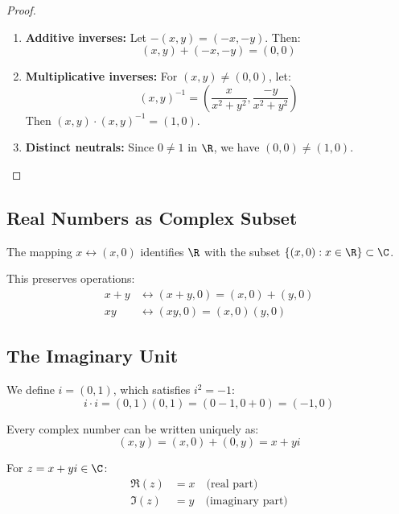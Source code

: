 \begin{proof}
\begin{enumerate}[label=(\roman*)]
        \item \textbf{Additive inverses:} Let $-(x,y) = (-x,-y)$. Then:
        \[
            (x,y) + (-x,-y) = (0,0)
        \]
        
        \item \textbf{Multiplicative inverses:} For $(x,y) \neq (0,0)$, let:
        \[
            (x,y)^{-1} = \left(\frac{x}{x^2+y^2}, \frac{-y}{x^2+y^2}\right)
        \]
        Then $(x,y) \cdot (x,y)^{-1} = (1,0)$.
        
        \item \textbf{Distinct neutrals:} Since $0 \neq 1$ in $\R$, we have $(0,0) \neq (1,0)$.
    \end{enumerate}
\end{proof}

\subsection{Real Numbers as Complex Subset}

The mapping $x \leftrightarrow (x,0)$ identifies $\R$ with the subset $\{(x,0) : x \in \R\} \subset \C$.

This preserves operations:
\begin{align}
    x + y &\leftrightarrow (x+y, 0) = (x,0) + (y,0) \\
    xy &\leftrightarrow (xy, 0) = (x,0)(y,0)
\end{align}

\subsection{The Imaginary Unit}

\begin{definition*}\label{def:imaginary-unit}
    We define $i = (0,1)$, which satisfies $i^2 = -1$:
    \[
        i \cdot i = (0,1)(0,1) = (0-1, 0+0) = (-1,0)
    \]
\end{definition*}

\begin{notation}
    Every complex number can be written uniquely as:
    \[
        (x,y) = (x,0) + (0,y) = x + yi
    \]
\end{notation}

\begin{definition}\label{def:real-imaginary-parts}
    For $z = x + yi \in \C$:
    \begin{align}
        \Re(z) &= x \quad \text{(real part)} \\
        \Im(z) &= y \quad \text{(imaginary part)}
    \end{align}
\end{definition}

